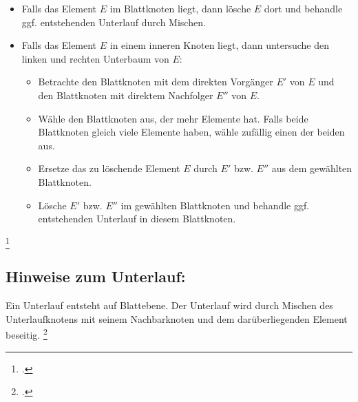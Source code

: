 \documentclass{lehramt-informatik-haupt}
\begin{document}
\begin{itemize}
\item Falls das Element $E$ im Blattknoten liegt, dann lösche $E$ dort
und behandle ggf. entstehenden Unterlauf durch Mischen.

\item Falls das Element $E$ in einem inneren Knoten liegt, dann
untersuche den linken und rechten Unterbaum von $E$:

\begin{itemize}
\item Betrachte den Blattknoten mit dem direkten Vorgänger $E'$ von $E$
und den Blattknoten mit direktem Nachfolger $E''$ von $E$.

\item Wähle den Blattknoten aus, der mehr Elemente hat. Falls beide
Blattknoten gleich viele Elemente haben, wähle zufällig einen der beiden
aus.

\item Ersetze das zu löschende Element $E$ durch $E'$ bzw. $E''$ aus dem
gewählten Blattknoten.

\item Lösche $E'$ bzw. $E''$ im gewählten Blattknoten und behandle ggf.
entstehenden Unterlauf in diesem Blattknoten.
\end{itemize}
\end{itemize}
\footcite[Seite 39]{aud:fs:5}

\subsection{Hinweise zum Unterlauf:}

Ein Unterlauf entsteht auf Blattebene. Der Unterlauf wird durch Mischen
des Unterlaufknotens mit seinem Nachbarknoten und dem darüberliegenden
Element beseitig.
\footcite[Seite 40]{aud:fs:5}


\literatur
\end{document}
